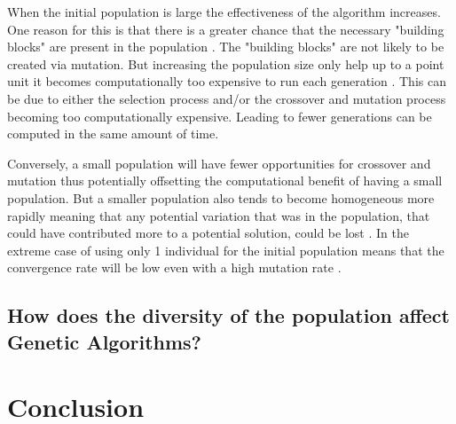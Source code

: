 \documentclass[12pt,a4paper]{report}
\begin{document}
When the initial population is large the effectiveness of the algorithm increases. One reason for this is that there is a greater chance that the necessary "building blocks" are present in the population \citep{harik}. The "building blocks" are not likely to be created via mutation. But increasing the population size only help up to a point unit it becomes computationally too expensive to run each generation \citep{gupta}. This can be due to either the selection process and/or the crossover and mutation process becoming too computationally expensive. Leading to fewer generations can be computed in the same amount of time. 

Conversely, a small population will have fewer opportunities for crossover and mutation thus potentially offsetting the computational benefit of having a small population. But a smaller population  also tends to become homogeneous more rapidly meaning that any potential variation that was in the population, that could have contributed more to a potential solution, could be lost \citep{de1990analysis}. In the extreme case of using only 1 individual for the initial population means that the convergence rate will be low even with a high mutation rate \citep{whit}.  

 


\subsection{How does the diversity of the population affect Genetic Algorithms?}

\section{Conclusion}


\end{document}
